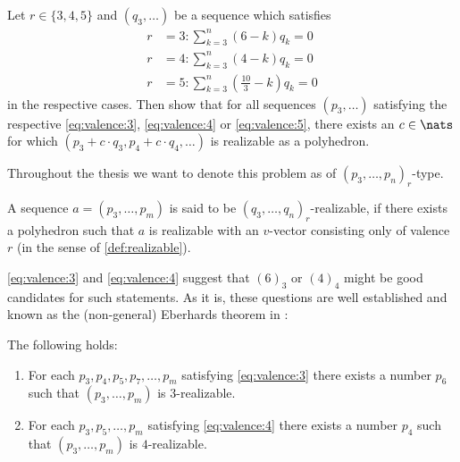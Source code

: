 \begin{problem}
  Let $r \in \{3, 4, 5\}$ and $(q_3, \dots)$ be a sequence which satisfies 
  \begin{align}
    r &= 3: \sum_{k=3}^n \left( 6            - k \right) q_k = 0 \label{eq:zero:curv:3}\\
    r &= 4: \sum_{k=3}^n \left( 4            - k \right) q_k = 0 \label{eq:zero:curv:4}\\
    r &= 5: \sum_{k=3}^n \left( \frac{10}{3} - k \right) q_k = 0 \label{eq:zero:curv:5}
  \end{align}
  in the respective cases. Then show that for all sequences $(p_3, \dots)$  satisfying the respective \autoref{eq:valence:3}, \autoref{eq:valence:4} or \autoref{eq:valence:5}, there exists an $c \in \nats$ for which $(p_3 + c \cdot q_3, p_4 + c \cdot q_4, \dots)$ is realizable as a polyhedron.
\end{problem}
\begin{notation}
  Throughout the thesis we want to denote this problem as of $(p_3, \dots, p_n)_r$-type.
\end{notation}
\begin{definition}[$r$-realizable]
  A sequence $a = (p_3, \dots, p_m)$ is said to be $(q_3, \dots, q_n)_r$-realizable, if there exists a polyhedron such that $a$ is realizable with an $v$-vector consisting only of valence $r$ (in the sense of \autoref{def:realizable}).
\end{definition}

\autoref{eq:valence:3} and \autoref{eq:valence:4} suggest that $(6)_3$ or $(4)_4$ might be good candidates for such statements. As it is, these questions are well established and known as the (non-general) Eberhards theorem in \cite{ConvexPolytopes}:
\renewcommand{\Itemautorefname}{Theorem \ref{thm:eberhard}}
\begin{theorem} \label{thm:eberhard} The following holds:
  \begin{enumerate}[label=(\roman*)]
  \item \label{thm:eberhard:3} For each $p_3, p_4, p_5, p_7, \dots, p_m$ satisfying \autoref{eq:valence:3} there exists a number $p_6$ such that $(p_3, \dots, p_m)$ is $3$-realizable. 
  \item \label{thm:eberhard:4} For each $p_3, p_5, \dots, p_m$ satisfying \autoref{eq:valence:4} there exists a number $p_4$ such that $(p_3, \dots, p_m)$ is $4$-realizable. 
  \end{enumerate}
\end{theorem}

